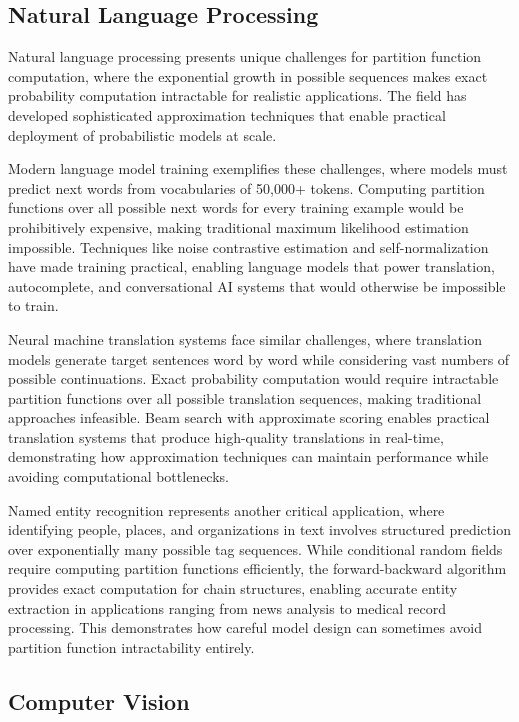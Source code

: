 \subsection{Natural Language Processing}

Natural language processing presents unique challenges for partition function computation, where the exponential growth in possible sequences makes exact probability computation intractable for realistic applications. The field has developed sophisticated approximation techniques that enable practical deployment of probabilistic models at scale.

Modern language model training exemplifies these challenges, where models must predict next words from vocabularies of 50,000+ tokens. Computing partition functions over all possible next words for every training example would be prohibitively expensive, making traditional maximum likelihood estimation impossible. Techniques like noise contrastive estimation and self-normalization have made training practical, enabling language models that power translation, autocomplete, and conversational AI systems that would otherwise be impossible to train.

Neural machine translation systems face similar challenges, where translation models generate target sentences word by word while considering vast numbers of possible continuations. Exact probability computation would require intractable partition functions over all possible translation sequences, making traditional approaches infeasible. Beam search with approximate scoring enables practical translation systems that produce high-quality translations in real-time, demonstrating how approximation techniques can maintain performance while avoiding computational bottlenecks.

Named entity recognition represents another critical application, where identifying people, places, and organizations in text involves structured prediction over exponentially many possible tag sequences. While conditional random fields require computing partition functions efficiently, the forward-backward algorithm provides exact computation for chain structures, enabling accurate entity extraction in applications ranging from news analysis to medical record processing. This demonstrates how careful model design can sometimes avoid partition function intractability entirely.

\subsection{Computer Vision}

